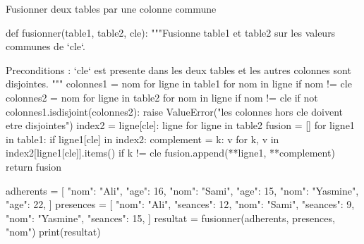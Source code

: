 \begin{codereference}{Fusionner deux tables par une colonne commune}
\begin{python}
def fusionner(table1, table2, cle):
    """Fusionne table1 et table2 sur les valeurs communes de `cle`.

    Preconditions : `cle` est presente dans les deux tables et les autres
    colonnes sont disjointes.
    """
    colonnes1 = {nom for ligne in table1 for nom in ligne if nom != cle}
    colonnes2 = {nom for ligne in table2 for nom in ligne if nom != cle}
    if not colonnes1.isdisjoint(colonnes2):
        raise ValueError("les colonnes hors cle doivent etre disjointes")
    index2 = {ligne[cle]: ligne for ligne in table2}
    fusion = []
    for ligne1 in table1:
        if ligne1[cle] in index2:
            complement = {
                k: v for k, v in index2[ligne1[cle]].items() if k != cle
            }
            fusion.append({**ligne1, **complement})
    return fusion


adherents = [
    {"nom": "Ali", "age": 16},
    {"nom": "Sami", "age": 15},
    {"nom": "Yasmine", "age": 22},
]
presences = [
    {"nom": "Ali", "seances": 12},
    {"nom": "Sami", "seances": 9},
    {"nom": "Yasmine", "seances": 15},
]
resultat = fusionner(adherents, presences, "nom")
print(resultat)
\end{python}

\begin{console}
\end{console}
\end{codereference}

